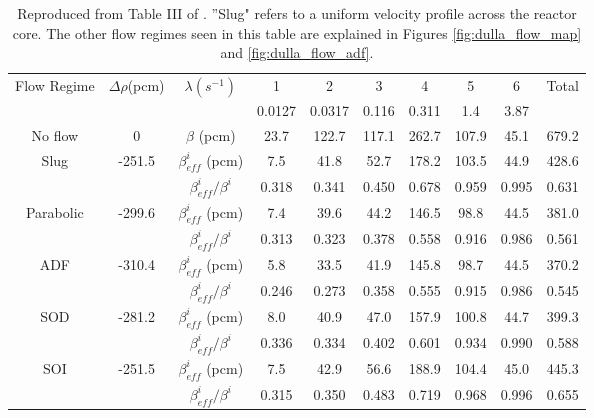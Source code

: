 \documentclass[review]{elsarticle}
\begin{document}
\begin{table}[h]
    \caption{Reproduced from Table III of \cite{dulla_interactions_2007}. 
    ''Slug"
        refers to a uniform velocity profile across the reactor core.
        The other flow regimes seen in this table are explained in
        Figures \ref{fig:dulla_flow_map} and \ref{fig:dulla_flow_adf}.} 
    \label{tbl:dulla_flow_regimes_beta}
    \begin{center}
        \begin{tabular}{|c|c|c|c|c|c|c|c|c|c|}
            \hline
            \multirow{2}{*}{Flow Regime} & \multirow{2}{*}{$\Delta \rho$(pcm)}
            &\multirow{2}{*}{$\lambda(s^{-1})$}&1 & 2 & 3 & 4 & 5 & 6 &
             \multirow{2}{*}{Total} \\
            \cline{4 - 9}
            & & & 0.0127 & 0.0317 & 0.116 & 0.311 & 1.4 & 3.87 & \\
            \hline
            No flow & 0 & $\beta$ (pcm) & 23.7 & 122.7 & 117.1 & 262.7 & 107.9 &
                45.1 & 679.2 \\
            \hline
            Slug & -251.5 & $\beta_{eff}^{i}$ (pcm) & 7.5 & 41.8 & 52.7 & 178.2&
                 103.5 & 44.9 & 428.6 \\
            & & $\beta_{eff}^{i}/\beta^{i}$ & 0.318 & 0.341 & 0.450 & 0.678 &
                0.959 & 0.995 & 0.631 \\
            \hline
            Parabolic & -299.6 & $\beta_{eff}^{i}$ (pcm) & 7.4 & 39.6 & 44.2 &
                146.5 & 98.8 & 44.5 & 381.0 \\
            & & $\beta_{eff}^{i}/\beta^{i}$ & 0.313 & 0.323 & 0.378 & 0.558 &
                0.916 & 0.986 & 0.561 \\
            \hline
            ADF & -310.4 & $\beta_{eff}^{i}$ (pcm) & 5.8 & 33.5 & 41.9 & 145.8 &
                 98.7 & 44.5 & 370.2 \\
            & & $\beta_{eff}^{i}/\beta^{i}$ & 0.246 & 0.273 & 0.358 & 0.555 &
                0.915 & 0.986 & 0.545 \\
            \hline
            SOD & -281.2 & $\beta_{eff}^{i}$ (pcm) & 8.0 & 40.9 & 47.0 & 157.9 &
                100.8 & 44.7 & 399.3 \\
            & & $\beta_{eff}^{i}/\beta^{i}$ & 0.336 & 0.334 & 0.402 & 0.601 &
                0.934 & 0.990 & 0.588 \\
            \hline
            SOI & -251.5 & $\beta_{eff}^{i}$ (pcm) & 7.5 & 42.9 & 56.6 & 188.9 &
                104.4 & 45.0 & 445.3 \\
            & & $\beta_{eff}^{i}/\beta^{i}$ & 0.315 & 0.350 & 0.483 & 0.719 &
                0.968 & 0.996 & 0.655 \\
            \hline
        \end{tabular}
    \end{center}
\end{table}
\end{document}
